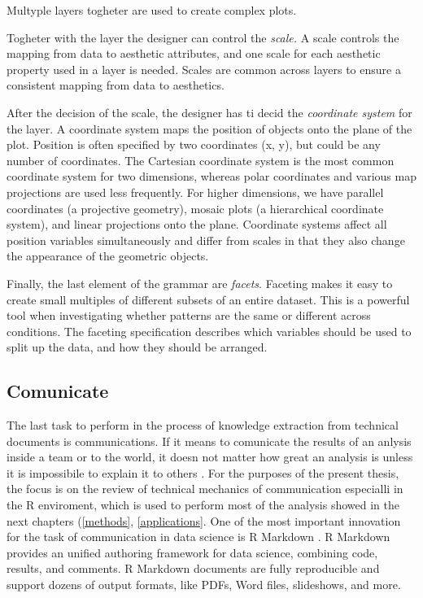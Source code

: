 \documentclass[]{book}
\begin{document}
Multyple layers togheter are used to create complex plots.

Togheter with the layer the designer can control the \emph{scale.} A
scale controls the mapping from data to aesthetic attributes, and one
scale for each aesthetic property used in a layer is needed. Scales are
common across layers to ensure a consistent mapping from data to
aesthetics.

After the decision of the scale, the designer has ti decid the
\emph{coordinate system} for the layer. A coordinate system maps the
position of objects onto the plane of the plot. Position is often
specified by two coordinates (x, y), but could be any number of
coordinates. The Cartesian coordinate system is the most common
coordinate system for two dimensions, whereas polar coordinates and
various map projections are used less frequently. For higher dimensions,
we have parallel coordinates (a projective geometry), mosaic plots (a
hierarchical coordinate system), and linear projections onto the plane.
Coordinate systems affect all position variables simultaneously and
differ from scales in that they also change the appearance of the
geometric objects.

Finally, the last element of the grammar are \emph{facets}. Faceting
makes it easy to create small multiples of different subsets of an
entire dataset. This is a powerful tool when investigating whether
patterns are the same or different across conditions. The faceting
specification describes which variables should be used to split up the
data, and how they should be arranged.

\subsection{Comunicate}\label{sotatoolscomunicate}

The last task to perform in the process of knowledge extraction from
technical documents is communications. If it means to comunicate the
results of an anlysis inside a team or to the world, it doesn not matter
how great an analysis is unless it is impossibile to explain it to
others \citep{wickham2016r}. For the purposes of the present thesis, the
focus is on the review of technical mechanics of communication
especialli in the R \citep{R-base} enviroment, which is used to perform
most of the analysis showed in the next chapters (\ref{methods},
\ref{applications}. One of the most important innovation for the task of
communication in data science is R Markdown \citep{R-rmarkdown}. R
Markdown provides an unified authoring framework for data science,
combining code, results, and comments. R Markdown documents are fully
reproducible and support dozens of output formats, like PDFs, Word
files, slideshows, and more.
\end{document}
